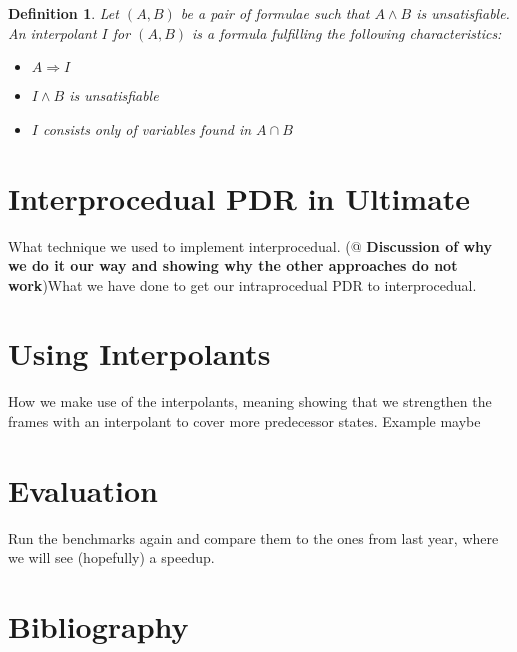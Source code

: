 \documentclass{article}
\newtheorem{mydef}{Definition}
\begin{document}
	\begin{mydef}
		Let $(A, B)$ be a pair of formulae such that $A \land B$ is unsatisfiable. An interpolant $I$ for $(A, B)$ is a formula fulfilling the following characteristics:
		\begin{itemize}
			\item $A \Rightarrow I$
			\item $I \land B$ is unsatisfiable
			\item $I$ consists only of variables found in $A \cap B$
		\end{itemize}
	\end{mydef}

	\pagebreak
	
	\section{Interprocedual PDR in Ultimate}
	What technique we used to implement interprocedual. (@ \textbf{Discussion of why we do it our way and showing why the other approaches do not work})What we have done to get our intraprocedual PDR to interprocedual.
	
	\section{Using Interpolants}
	How we make use of the interpolants, meaning showing that we strengthen the frames with an interpolant to cover more predecessor states. Example maybe
	
	\section{Evaluation}
	Run the benchmarks again and compare them to the ones from last year, where we will see (hopefully) a speedup.
	
	\section{Bibliography}

	
\end{document}
